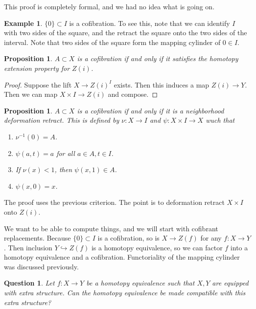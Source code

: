 \documentclass[leqno, openany]{memoir}
\newtheorem{prop}[thm]{Proposition}
\newtheorem{quest}[thm]{Question}
\theoremstyle{definition}
\newtheorem{exm}[thm]{Example}
\theoremstyle{remark}
\theoremstyle{plain}
\theoremstyle{definition}
\theoremstyle{remark}
\begin{document}
This proof is completely formal, and we had no idea what is going on.

\begin{exm} $ \{ 0 \} \subset I$ is a cofibration. To see this, note that we
    can identify $I$ with two sides of the square, and the retract the square
    onto the two sides of the interval. Note that two sides of the square form
    the mapping cylinder of $0 \in I$.  \end{exm}

\begin{prop} $A \subset X$ is a cofibration if and only if it satisfies the
homotopy extension property for $Z(i)$.  \end{prop}

\begin{proof} Suppose the lift $X \to Z(i)^I$ exists. Then this induces a map
$Z(i) \to Y$. Then we can map $X \times I \to Z(i)$ and compose.  \end{proof}

\begin{prop} $A \subset X$ is a cofibration if and only if it is a neighborhood
    deformation retract. This is defined by $\nu \colon X \to I$ and $\psi
    \colon X \times I \to X$ wuch that \begin{enumerate} \item $\nu^{-1}(0) =
        A$.  \item $\psi(a,t) = a$ for all $a \in A, t \in I$.  \item If
$\nu(x) < 1$, then $\psi(x,1) \in A$.  \item $\psi(x,0) = x$.  \end{enumerate}
\end{prop}

The proof uses the previous criterion. The point is to deformation retract $X
\times I$ onto $Z(i)$.

We want to be able to compute things, and we will start with cofibrant
replacements. Because $\{ 0 \} \subset I$ is a cofibration, so is $X \to Z(f)$
for any $f \colon X \to Y$. Then inclusion $Y \hookrightarrow Z(f)$ is a
homotopy equivalence, so we can factor $f$ into a homotopy equivalence and a
cofibration. Functoriality of the mapping cylinder was discussed previously.

\begin{quest} Let $f \colon X \to Y$ be a homotopy equivalence such that $X,Y$
are equipped with extra structure. Can the homotopy equivalence be made
compatible with this extra structure?  \end{quest}
\end{document}
